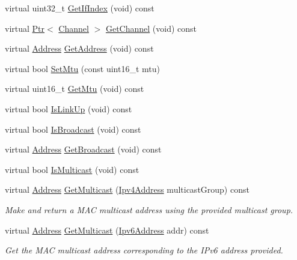 \begin{DoxyCompactItemize}
\item 
virtual uint32\+\_\+t \hyperlink{classns3_1_1UanNetDevice_acf7b3a85853c4160d1a134a02647e0b3}{Get\+If\+Index} (void) const 
\item 
virtual \hyperlink{classns3_1_1Ptr}{Ptr}$<$ \hyperlink{classns3_1_1Channel}{Channel} $>$ \hyperlink{classns3_1_1UanNetDevice_a5254720ba19b94e1123beea1d3744c29}{Get\+Channel} (void) const 
\item 
virtual \hyperlink{classns3_1_1Address}{Address} \hyperlink{classns3_1_1UanNetDevice_a82f8ad21dacb782e82a4aff50c32a5d7}{Get\+Address} (void) const 
\item 
virtual bool \hyperlink{classns3_1_1UanNetDevice_a2e7ad23d65650a02984e6c6afaa1744b}{Set\+Mtu} (const uint16\+\_\+t mtu)
\item 
virtual uint16\+\_\+t \hyperlink{classns3_1_1UanNetDevice_a56a7bf94f2d58cde6c564465eacc47ad}{Get\+Mtu} (void) const 
\item 
virtual bool \hyperlink{classns3_1_1UanNetDevice_aecf041a5878cf1aab62e155fe007e52f}{Is\+Link\+Up} (void) const 
\item 
virtual bool \hyperlink{classns3_1_1UanNetDevice_a813bf46757bd911908aa92a10c1a7d15}{Is\+Broadcast} (void) const 
\item 
virtual \hyperlink{classns3_1_1Address}{Address} \hyperlink{classns3_1_1UanNetDevice_a0a7b435a96c84f3ad394df300946a5af}{Get\+Broadcast} (void) const 
\item 
virtual bool \hyperlink{classns3_1_1UanNetDevice_ad5245f51eb712c75c30d99ac97b3706b}{Is\+Multicast} (void) const 
\item 
virtual \hyperlink{classns3_1_1Address}{Address} \hyperlink{classns3_1_1UanNetDevice_af79d030e9e0d8fc4bb53483ac500f99b}{Get\+Multicast} (\hyperlink{classns3_1_1Ipv4Address}{Ipv4\+Address} multicast\+Group) const 
\begin{DoxyCompactList}\small\item\em Make and return a M\+AC multicast address using the provided multicast group. \end{DoxyCompactList}\item 
virtual \hyperlink{classns3_1_1Address}{Address} \hyperlink{classns3_1_1UanNetDevice_ace5aeef735e5b5d314a4c9a3802c244b}{Get\+Multicast} (\hyperlink{classns3_1_1Ipv6Address}{Ipv6\+Address} addr) const 
\begin{DoxyCompactList}\small\item\em Get the M\+AC multicast address corresponding to the I\+Pv6 address provided. \end{DoxyCompactList}\item 

\end{DoxyCompactItemize}
